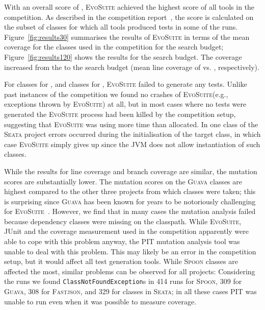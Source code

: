 \documentclass[sigconf]{acmart}
\newcommand{\project}[1]{\textsc{#1}\xspace}
\newcommand{\Spoon}{\project{Spoon}}
\newcommand{\Guava}{\project{Guava}}
\newcommand{\Fastjson}{\project{Fastjson}}
\newcommand{\Seata}{\project{Seata}}
\newcommand{\EVOSUITE}{\textsc{EvoSuite}\xspace}
\begin{document}
With an overall score of \score, \EVOSUITE achieved the highest score of all
tools in the competition. As described in the competition
report~\cite{SBST-toolcomp22}, the score is calculated on the subset of \cuts classes
for which all tools produced tests in some of the runs.
Figure~\ref{fig:results30} summarises the results of \EVOSUITE in terms of the
mean coverage for the \cuts classes used in the competition for the \budgetShort search budget; Figure~\ref{fig:results120} shows the results for the \budgetLong search budget. The coverage
increased from the \budgetShort to the \budgetLong search budget (mean line
coverage of \avgLinesCoverageRatioShort vs. \avgLinesCoverageRatioLong, respectively). 

For \numTestGenFailedShort classes for \budgetShort, and \numTestGenFailedLong
classes for \budgetLong, \EVOSUITE failed to generate any tests. Unlike past
instances of the competition we found no crashes of \EVOSUITE (e.g., exceptions
thrown by \EVOSUITE) at all, but in most cases where no tests were generated
the \EVOSUITE process had been killed by the competition setup, suggesting that
\EVOSUITE was using more time than allocated. In one class of the \Seata project
errors occurred during the initialisation of the target class, in which case
\EVOSUITE simply gives up since the JVM does not allow instantiation of such
classes.



While the results for line coverage and branch coverage are similar, the
mutation scores are substantially lower. The mutation scores on the \Guava
classes are highest compared to the other three projects from which classes
were taken; this is surprising since \Guava has been known for years to be
notoriously challenging for
\EVOSUITE~\cite{campos2015continuous,almulla2017using}. However, we find that
in many cases the mutation analysis failed because dependency classes were
missing on the classpath. While \EVOSUITE, JUnit and the coverage measurement
used in the competition apparently were able to cope with this problem anyway,
the PIT mutation analysis tool was unable to deal with this problem. This may
likely be an error in the competition setup, but it would affect all test
generation tools. While \Spoon classes are affected the most, similar problems
can be observed for all projects: Considering the \budgetLong runs we found
\texttt{ClassNotFoundException}s in 414 runs for \Spoon, 309 for \Guava, 308 for
\Fastjson, and 329 for classes in \Seata; in all these cases PIT was unable to
run even when it was possible to measure coverage.
\end{document}
